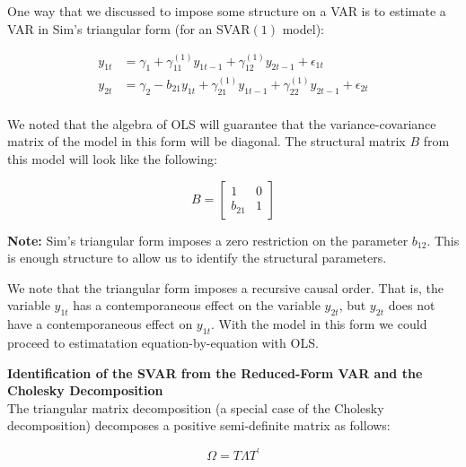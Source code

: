 \documentclass[11pt]{article}
\begin{document}
\newpage
One way that we discussed to impose some structure on a VAR is to estimate a VAR in Sim's triangular form
(for an SVAR$(1)$ model):

\vspace{3mm}
\begin{align*}
y_{1t} &= \gamma_{1} + \gamma_{11}^{(1)} y_{1t-1} + \gamma_{12}^{(1)} y_{2t-1} + \epsilon_{1t} \\
y_{2t} &= \gamma_{2} - b_{21} y_{1t} + \gamma_{21}^{(1)} y_{1t-1} + \gamma_{22}^{(1)} y_{2t-1} + \epsilon_{2t} \\
\end{align*}

\vspace{3.5mm}
We noted that the algebra of OLS will guarantee that the variance-covariance matrix of the model in this form
will be diagonal.  The structural matrix $B$ from this model will look like the following:

\begin{equation*}
B = \begin{bmatrix} 1 & 0 \\ b_{21} & 1 \end{bmatrix}
\end{equation*}

\vspace{3.5mm}
\textbf{Note:} Sim's triangular form imposes a zero restriction on the parameter $b_{12}$. This is enough 
structure to allow us to identify the structural parameters.

\vspace{5mm}
We note that the triangular form imposes a recursive causal order.  That is, the variable $y_{1t}$ has a contemporaneous
effect on the variable $y_{2t}$, but $y_{2t}$ does not have a contemporaneous effect on $y_{1t}$. With the model in this
form we could proceed to estimatation equation-by-equation with OLS.

\vspace{10mm}
\textbf{Identification of the SVAR from the Reduced-Form VAR and the Cholesky Decomposition} \\

\vspace{3.5mm}
The triangular matrix decomposition (a special case of the Cholesky decomposition) decomposes a 
positive semi-definite matrix as follows:\

\begin{equation*}
\Omega = T \Lambda T^{\prime}
\end{equation*}
\end{document}
